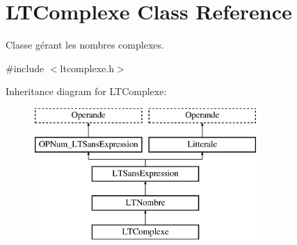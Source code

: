 \hypertarget{class_l_t_complexe}{}\section{L\+T\+Complexe Class Reference}
\label{class_l_t_complexe}


Classe gérant les nombres complexes.  




{\ttfamily \#include $<$ltcomplexe.\+h$>$}

Inheritance diagram for L\+T\+Complexe\+:\begin{figure}[H]
\begin{center}
\leavevmode
\includegraphics[height=5.000000cm]{class_l_t_complexe}
\end{center}
\end{figure}
